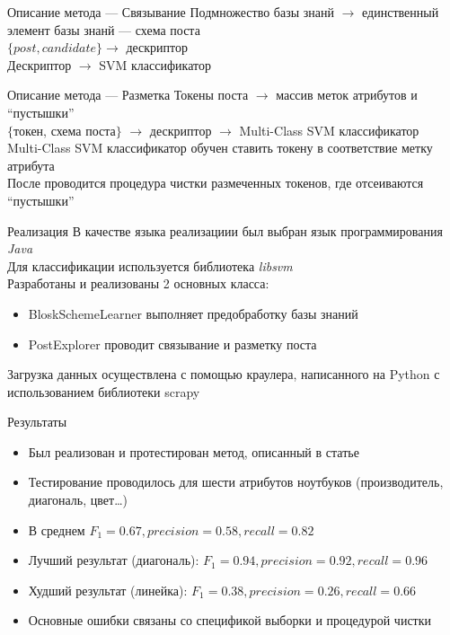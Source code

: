 \documentclass[14pt,mathserif,aspectratio=43]{beamer}
\begin{document}
\begin{frame}{Описание метода --- Связывание}
    	Подмножество базы знанй $\to$ единственный элемент базы знанй --- схема поста\\
    	$\{post,candidate\} \to$  дескриптор\\
		Дескриптор $\to$ SVM классификатор\\
\end{frame}

\begin{frame}{Описание метода --- Разметка}
    	Токены поста $\to$ массив меток атрибутов и ``пустышки''\\
		$\{$токен, схема поста$\}$ $\to$ дескриптор $\to$ Multi-Class SVM классификатор\\
		Multi-Class SVM классификатор обучен ставить токену в соответствие метку атрибута\\
		После проводится процедура чистки размеченных токенов, где отсеиваются ``пустышки''\\
\end{frame}

\begin{frame}{Реализация}
		В качестве языка реализациии был выбран язык программирования \textit{Java}\\
		Для классификации используется библиотека \textit{libsvm}\\
		\medskip
		Разработаны и реализованы 2 основных класса:\\
	    \begin{itemize}
	    	\item BloskSchemeLearner выполняет предобработку базы знаний

		    \item PostExplorer проводит связывание и разметку поста
	    \end{itemize}
    	Загрузка данных осуществлена с помощью краулера, написанного на Python с использованием библиотеки scrapy\\
\end{frame}

\begin{frame}{Результаты}
	\begin{itemize}
		\item Был реализован и протестирован метод, описанный в статье

		\item Тестирование проводилось для шести атрибутов ноутбуков (производитель, диагональ, цвет\ldots)

		\item В среднем $F_1= 0.67, precision = 0.58, recall = 0.82$

		\item Лучший результат (диагональ): $F_1= 0.94, precision = 0.92, recall = 0.96$

		\item Худший результат (линейка): $F_1= 0.38, precision = 0.26, recall = 0.66$

		\item Основные ошибки связаны со спецификой выборки и процедурой чистки
	\end{itemize}
\end{frame}
\end{document}
